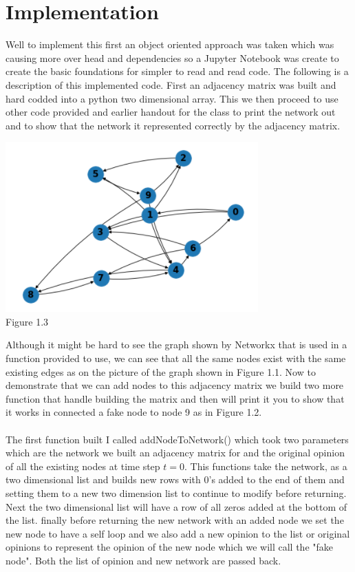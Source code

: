 \documentclass[letterpaper]{article}
\begin{document}
\section{Implementation}  

Well to implement this first an object oriented approach was taken which was causing more over head and dependencies so a Jupyter Notebook was create to create the basic foundations for simpler to read and read code.  The following is a description of this implemented code.  First an adjacency matrix was built and hard codded into a python two dimensional array.  This we then proceed to use other code provided and earlier handout for the class to print the network out and to show that the network it represented correctly by the adjacency matrix.  
\begin{center}
	\includegraphics[scale=1.5]{./Images/Figure1.3} \\
	Figure 1.3
\end{center}
Although it might be hard to see the graph shown by Networkx that is used in a function provided to use, we can see that all the same nodes exist with the same existing edges as on the picture of the graph shown in Figure 1.1.  Now to demonstrate that we can add nodes to this adjacency matrix we build two more function that handle building the matrix and then will print it you to show that it works in connected a fake node to node 9 as in Figure 1.2.\\\\
The first function built I called addNodeToNetwork() which took two parameters which are the network we built an adjacency matrix for and the original opinion of all the existing nodes at time step $t=0$.  This functions take the network, as a two dimensional list and builds new rows with 0's added to the end of them and setting them to a new two dimension list to continue to modify before returning.  Next the two dimensional list will have a row of all zeros added at the bottom of the list. finally before returning the new network with an added node we set the new node to have a self loop and we also add a new opinion to the list or original opinions to represent the opinion of the new node which we will call the "fake node".  Both the list of opinion and new network are passed back. \\\\
\end{document}
